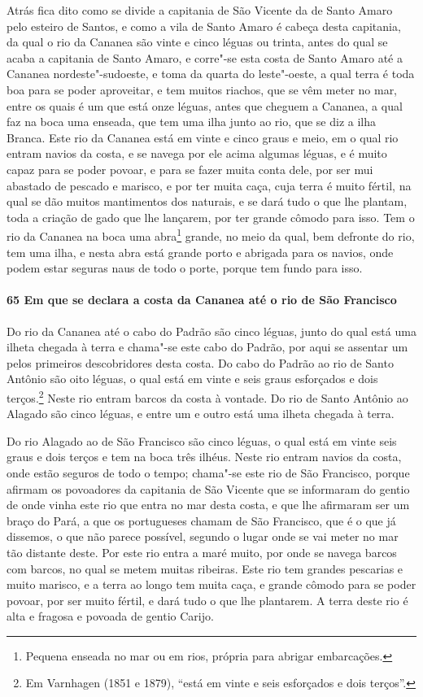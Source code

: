 Atrás fica dito como se divide a capitania de São Vicente da de Santo Amaro pelo esteiro
de Santos, e como a vila de Santo Amaro é cabeça desta capitania, da qual o rio da Cananea
são vinte e cinco léguas ou trinta, antes do qual se acaba a capitania de Santo Amaro, e
corre"-se esta costa de Santo Amaro até a Cananea nordeste"-sudoeste, e toma da quarta do
leste"-oeste, a qual terra é toda boa para se poder aproveitar, e tem muitos riachos, que
se vêm meter no mar, entre os quais é um que está onze léguas, antes que cheguem a
Cananea, a qual faz na boca uma enseada, que tem uma ilha junto ao rio, que se diz a ilha
Branca. Este rio da Cananea está em vinte e cinco graus e meio, em o qual rio entram
navios da costa, e se navega por ele acima algumas léguas, e é muito capaz para se poder
povoar, e para se fazer muita conta dele, por ser mui abastado de pescado e marisco, e por
ter muita caça, cuja terra é muito fértil, na qual se dão muitos mantimentos dos naturais,
e se dará tudo o que lhe plantam, toda a criação de gado que lhe lançarem, por ter grande
cômodo para isso. Tem o rio da Cananea na boca uma abra\footnote{ Pequena enseada no mar
ou em rios, própria para abrigar embarcações.} grande, no meio da qual, bem defronte do
rio, tem uma ilha, e nesta abra está grande porto e abrigada para os navios, onde podem
estar seguras naus de todo o porte, porque tem fundo para isso.

\paragraph{65 Em que se declara a costa da Cananea até o rio de São Francisco}

Do rio da Cananea até o cabo do Padrão são cinco léguas, junto do qual está uma ilheta
chegada à terra e chama"-se este cabo do Padrão, por aqui se assentar um pelos primeiros
descobridores desta costa. Do cabo do Padrão ao rio de Santo Antônio são oito léguas, o
qual está em vinte e seis graus esforçados e dois terços.\footnote{ Em Varnhagen (1851 e
1879), ``está em vinte e seis esforçados e dois terços''.} Neste rio entram barcos da
costa à vontade. Do rio de Santo Antônio ao Alagado são cinco léguas, e entre um e outro
está uma ilheta chegada à terra.

Do rio Alagado ao de São Francisco são cinco léguas, o qual está em vinte seis graus e
dois terços e tem na boca três ilhéus. Neste rio entram navios da costa, onde estão
seguros de todo o tempo; chama"-se este rio de São Francisco, porque afirmam os povoadores
da capitania de São Vicente que se informaram do gentio de onde vinha este rio que entra
no mar desta costa, e que lhe afirmaram ser um braço do Pará, a que os portugueses chamam
de São Francisco, que é o que já dissemos, o que não parece possível, segundo o lugar onde
se vai meter no mar tão distante deste. Por este rio entra a maré muito, por onde se
navega barcos com barcos, no qual se metem muitas ribeiras. Este rio tem grandes pescarias
e muito marisco, e a terra ao longo tem muita caça, e grande cômodo para se poder povoar,
por ser muito fértil, e dará tudo o que lhe plantarem. A terra deste rio é alta e fragosa
e povoada de gentio Carijo.

